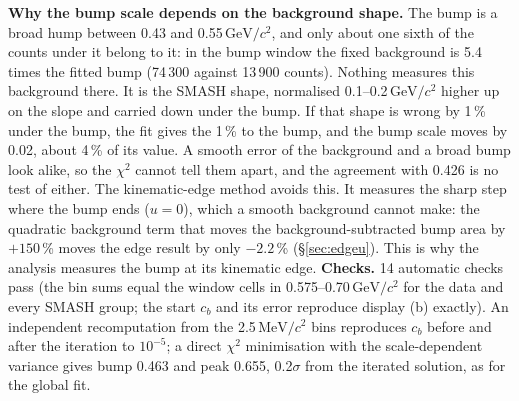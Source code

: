 \documentclass[11pt,a4paper]{article}
\newcommand{\GeVcc}{\ensuremath{\mathrm{GeV}/c^{2}}\xspace}
\newcommand{\MeVcc}{\ensuremath{\mathrm{MeV}/c^{2}}\xspace}
\begin{document}
\textbf{Why the bump scale depends on the background shape.} The bump is a broad hump between 0.43 and 0.55\,\GeVcc, and only about one sixth
of the counts under it belong to it: in the bump window the fixed background is 5.4 times the fitted bump (74\,300 against 13\,900 counts).
Nothing measures this background there. It is the SMASH shape, normalised 0.1--0.2\,\GeVcc higher up on the slope and carried down under the
bump. If that shape is wrong by 1\,\% under the bump, the fit gives the 1\,\% to the bump, and the bump scale moves by 0.02, about 4\,\% of its
value. A smooth error of the background and a broad bump look alike, so the $\chi^2$ cannot tell them apart, and the agreement with 0.426 is no
test of either. The kinematic-edge method avoids this. It measures the sharp step where the bump ends ($u=0$), which a smooth background cannot
make: the quadratic background term that moves the background-subtracted bump area by $+150$\,\% moves the edge result by only $-2.2$\,\%
(\S\ref{sec:edgeu}). This is why the analysis measures the bump at its kinematic edge.
\textbf{Checks.} 14 automatic checks pass (the bin sums equal the window cells in 0.575--0.70\,\GeVcc for the data and every SMASH group; the start
$c_b$ and its error reproduce display (b) exactly). An independent recomputation from the 2.5\,\MeVcc bins reproduces $c_b$ before and after the
iteration to $10^{-5}$; a direct $\chi^2$ minimisation with the scale-dependent variance gives bump 0.463 and peak 0.655, 0.2$\sigma$ from the
iterated solution, as for the global fit.
\end{document}
